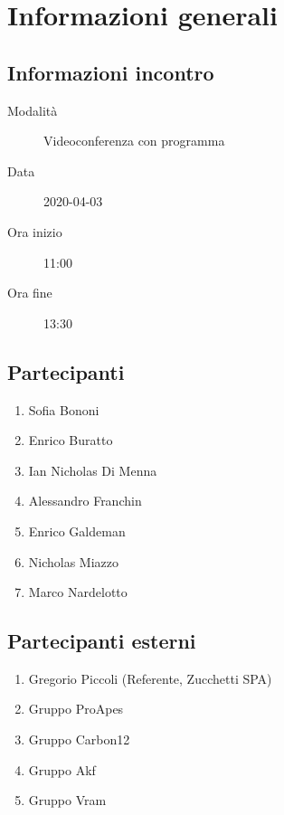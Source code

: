 \documentclass{article}
\begin{document}


\section{Informazioni generali}%
\label{sec:informazioni_generali}

\subsection{Informazioni incontro}%
\label{sub:informazioni_incontro}

\begin{description}
  \item[Modalità] Videoconferenza con programma 
  \item[Data] 2020-04-03
  \item[Ora inizio] 11:00
  \item[Ora fine] 13:30
\end{description}

\subsection{Partecipanti}%
\label{sub:partecipanti}

\begin{enumerate}
  \item Sofia Bononi
  \item Enrico Buratto
  \item Ian Nicholas Di Menna
  \item Alessandro Franchin
  \item Enrico Galdeman
  \item Nicholas Miazzo
  \item Marco Nardelotto
\end{enumerate}

\subsection{Partecipanti esterni}%
\label{sub:partecipanti esterni}

\begin{enumerate}
    \item Gregorio Piccoli (Referente, Zucchetti SPA)
    \item Gruppo ProApes
    \item Gruppo Carbon12
    \item Gruppo Akf
    \item Gruppo Vram
\end{enumerate}
\end{document}
